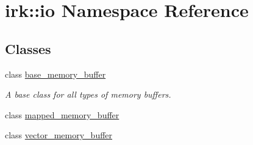 \hypertarget{namespaceirk_1_1io}{}\section{irk\+:\+:io Namespace Reference}
\label{namespaceirk_1_1io}
\subsection*{Classes}
\begin{DoxyCompactItemize}
\item 
class \mbox{\hyperlink{classirk_1_1io_1_1base__memory__buffer}{base\+\_\+memory\+\_\+buffer}}
\begin{DoxyCompactList}\small\item\em A base class for all types of memory buffers. \end{DoxyCompactList}\item 
class \mbox{\hyperlink{classirk_1_1io_1_1mapped__memory__buffer}{mapped\+\_\+memory\+\_\+buffer}}
\item 
class \mbox{\hyperlink{classirk_1_1io_1_1vector__memory__buffer}{vector\+\_\+memory\+\_\+buffer}}
\end{DoxyCompactItemize}
